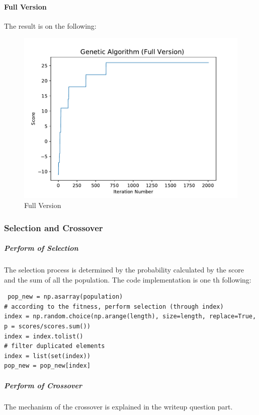 \documentclass[11pt, a4paper]{article}
\begin{document}
\paragraph{Full Version}

The result is on the following:

\begin{figure}[htbp]
	\centering 
	\includegraphics[scale=0.4]{up3_3}
	\caption{Full Version} %
\end{figure}

\subsubsection{Selection and Crossover}

\subparagraph{Perform of Selection}

The selection process is determined by the probability calculated by the score and the sum of all the population. The code implementation is one th following:

\newpage

\begin{lstlisting}
 pop_new = np.asarray(population)
# according to the fitness, perform selection (through index)
index = np.random.choice(np.arange(length), size=length, replace=True, p = scores/scores.sum())
index = index.tolist()
# filter duplicated elements
index = list(set(index))
pop_new = pop_new[index]
\end{lstlisting}


\subparagraph{Perform of Crossover}

The mechanism of the crossover is explained in the writeup question part. 
\end{document}
